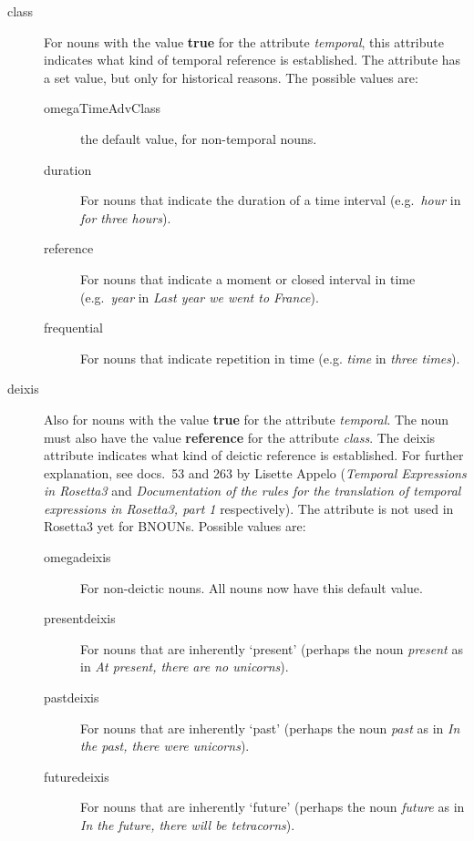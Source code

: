 \begin{description}
\item[class] For nouns with the value {\bf true} for 
the attribute {\em temporal\/}, this attribute indicates what kind 
of temporal reference is established. The attribute has a set value, but only 
for historical reasons. The possible values are:           
  \begin{description}
  \item[omegaTimeAdvClass] the default value, for non-temporal nouns.
  \item[duration] For nouns that indicate the duration of a time interval 
(e.g.\ {\em hour\/} in {\em for three hours\/}).
  \item[reference] For nouns that indicate a moment or closed interval in time 
(e.g.\ {\em year\/} in {\em Last year we went to France\/}).
  \item[frequential] For nouns that indicate repetition in time (e.g. 
{\em time\/} in {\em three times\/}).
  \end{description}

\item[deixis] Also for nouns with the value {\bf true} for 
the attribute {\em temporal\/}. The noun must also have the value {
\bf reference} for the attribute {\em class\/}. The deixis attribute indicates 
what kind of deictic reference is established. For further explanation, 
see docs.\ 53 and 263 by 
Lisette Appelo ({\em Temporal Expressions in Rosetta3\/} and {\em Documentation 
of the rules for the translation of temporal expressions in Rosetta3, part 1\/} 
respectively). The attribute is not 
used in Rosetta3 yet for BNOUNs. Possible values are:
  \begin{description}
  \item[omegadeixis] For non-deictic nouns. All nouns now have this default 
value.
  \item[presentdeixis] For nouns that are inherently `present' (perhaps the 
noun {\em present\/} as in {\em At present, there are no unicorns\/}).
  \item[pastdeixis] For nouns that are inherently `past' (perhaps the 
noun {\em past\/} as in {\em In the past, there were unicorns\/}).
  \item[futuredeixis] For nouns that are inherently `future' (perhaps the 
noun {\em future\/} as in {\em In the future, there will be tetracorns\/}).
  \end{description}


\end{description}
